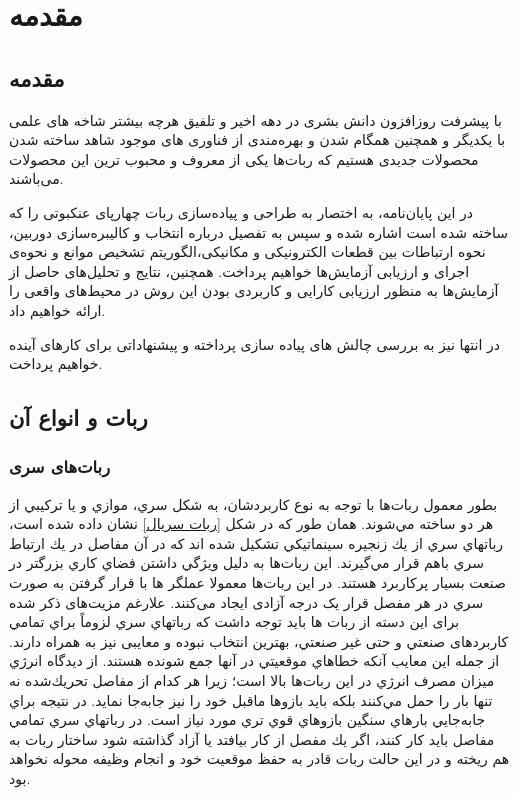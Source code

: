 \chapter{مقدمه}

\section{مقدمه}
با پیشرفت روزافزون دانش بشری در دهه اخیر و تلفیق هرچه بیشتر شاخه های علمی با یکدیگر و همچنین همگام شدن و بهره‌مندی از فناوری های موجود شاهد ساخته شدن محصولات جدیدی هستیم که ربات‌ها یکی از معروف و محبوب ترین این محصولات می‌باشند.

در این پایان‌نامه، به اختصار به طراحی و پیاده‌سازی ربات چهارپای عنکبوتی را که ساخته شده است اشاره شده و سپس به تفصیل درباره انتخاب و کالیبره‌سازی دوربین، نحوه ارتباطات بین قطعات الکترونیکی و مکانیکی،الگوریتم تشخیص موانع و نحوه‌ی اجرای و ارزیابی آزمایش‌ها خواهیم پرداخت. همچنین، نتایج و تحلیل‌های حاصل از آزمایش‌ها به منظور ارزیابی کارایی و کاربردی بودن این روش در محیط‌های واقعی را ارائه خواهیم داد.

در انتها نیز به بررسی چالش های پیاده سازی پرداخته و پیشنهاداتی برای کارهای آینده خواهیم پرداخت.


\section{ربات و انواع آن}

\subsection{ربات‌های سری}
بطور معمول ربات‌ها با توجه به نوع كاربردشان، به شكل سري، موازي و يا تركيبي از هر دو ساخته مي‌شوند. همان طور كه در شكل
\ref{ربات سریال}
نشان داده شده است، رباتهاي سري از يك زنجيره
سينماتيكي تشكيل شده اند كه در آن مفاصل‌ در يك ارتباط سري باهم قرار مي‌گيرند. اين ربات‌ها به دليل ويژگي داشتن فضاي كاري بزرگتر در صنعت بسيار پرکاربرد هستند.
در این ربات‌ها معمولا عملگر
\noindent\unskip{}
ها با قرار گرفتن به صورت سري در هر مفصل قرار یک درجه آزادی ایجاد می‌کنند.
علارغم مزیت‌های ذکر شده برای این دسته از ربات ها باید توجه داشت که رباتهاي سري لزوماً براي تمامي کاربرد‌های صنعتي و حتی غير صنعتي، بهترين انتخاب نبوده و معایبی نیز به همراه دارند. از جمله این معایب آنکه خطاهاي موقعيتي در آنها جمع شونده هستند. از ديدگاه انرژي ميزان مصرف انرژي در اين ربات‌ها بالا است؛ زيرا هر كدام از
مفاصل تحريك‌شده نه تنها بار را حمل مي‌كنند بلكه بايد بازوها ماقبل خود را نيز جابه‌جا نمايد. در نتيجه براي جابه‌جايي بارهاي سنگين بازوهاي قوي تري مورد نياز است. در رباتهاي سري تمامي مفاصل بايد كار كنند، اگر يك مفصل از كار بيافتد يا آزاد گذاشته شود ساختار ربات به هم ریخته و در اين حالت ربات قادر به حفظ موقعيت خود و انجام وظیفه
\noindent\unskip{}
محوله نخواهد بود.


